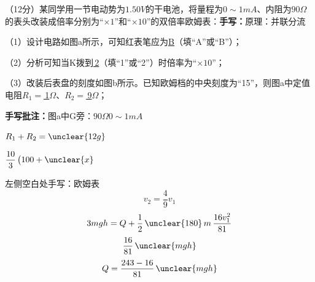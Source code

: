 \begin{problem}[19]
（12分）某同学用一节电动势为$1.50\unit{V}$的干电池，将量程为$0\sim1\unit{mA}$、内阻为$90\unit{\Omega}$的表头改装成倍率分别为“$\times1$”和“$\times10$”的双倍率欧姆表：\quad \textbf{手写：}原理：并联分流%

（1）设计电路如图a所示，可知红表笔应为\underline{\quad B\quad}（填“A”或“B”\unclear{$\checkmark$}）；%

（2）分析可知当K拨到\underline{\quad{}\,2\quad}（填“1”或“2”）时倍率为“$\times10$”；%

（3）改装后表盘的刻度如图b所示。已知欧姆档的中央刻度为“15”，则图a中定值电阻$R_1=$\underline{\quad{}\,1\quad}$\unit{\Omega}$、$R_2=$\underline{\quad{}\,9\quad}$\unit{\Omega}$；%


\end{problem}

\textbf{手写批注：}图a中G旁：$90\unit{\Omega}$\quad $0\sim1\unit{mA}$

$R_1+R_2=\unclear{12g}$

$\dfrac{10}{3}\,\bigl(100+\unclear{x}$%

左侧空白处手写：欧姆表\quad {}
\[
v_2=\frac{4}{9}v_1
\]
\[
3mgh=Q+\frac{1}{2}\,\unclear{180}\,m\,\frac{16v_1^{2}}{81}
\]%
\[
\frac{16}{81}\,\unclear{mgh}
\]%
\[
Q=\frac{243-16}{81}\,\unclear{mgh}
\]%
